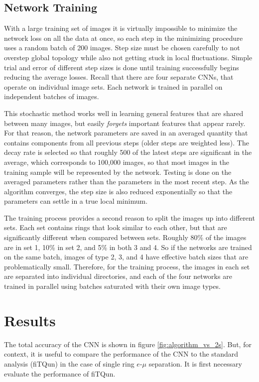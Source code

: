 \documentclass[twoside,twocolumn]{article}
\begin{document}
\subsection{Network Training}

With a large training set of images it is virtually impossible to minimize the network loss on all the data at once, so each step in the minimizing procedure uses a random batch of 200 images. Step size must be chosen carefully to not overstep global topology while also not getting stuck in local fluctuations. Simple trial and error of different step sizes is done until training successfully begins reducing the average losses. Recall that there are four separate CNNs, that operate on individual image sets. Each network is trained in parallel on independent batches of images.

This stochastic method works well in learning general features that are shared between many images, but easily \textit{forgets} important features that appear rarely. For that reason, the network parameters are saved in an averaged quantity that contains components from all previous steps (older steps are weighted less). The decay rate is selected so that roughly 500 of the latest steps are significant in the average, which corresponds to 100,000 images, so that most images in the training sample will be represented by the network. Testing is done on the averaged parameters rather than the parameters in the most recent step. As the algorithm converges, the step size is also reduced exponentially so that the parameters can settle in a true local minimum.

The training process provides a second reason to split the images up into different sets. Each set contains rings that look similar to each other, but that are significantly different when compared between sets. Roughly 80\% of the images are in set 1, 10\% in set 2, and 5\% in both 3 and 4. So if the networks are trained on the same batch, images of type 2, 3, and 4 have effective batch sizes that are problematically small. Therefore, for the training process, the images in each set are separated into individual directories, and each of the four networks are trained in parallel using batches saturated with their own image types. 

\section{Results}

The total accuracy of the CNN is shown in figure \ref{fig:algorithm_vs_2s}. But, for context, it is useful to compare the performance of the CNN to the standard analysis (fiTQun) in the case of single ring $e$-$\mu$ separation. It is first necessary evaluate the performance of fiTQun.
\end{document}
